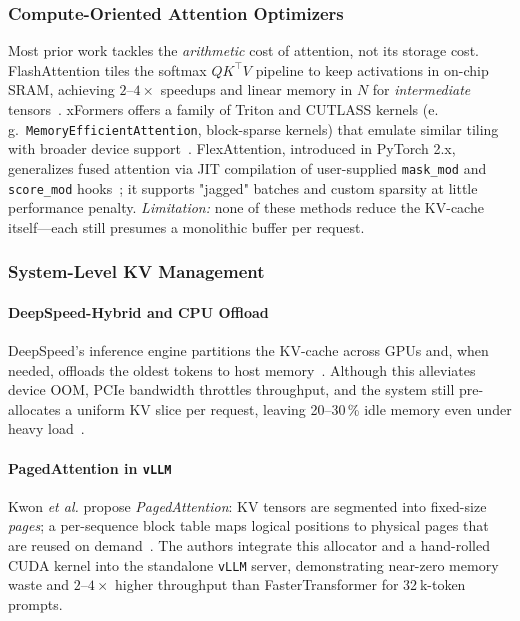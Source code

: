 \documentclass[conference]{IEEEtran}
\begin{document}
\subsubsection{Compute-Oriented Attention Optimizers}
Most prior work tackles the \emph{arithmetic} cost of attention, not its storage cost.  
FlashAttention tiles the softmax \(QK^{\top}V\) pipeline to keep activations in on-chip SRAM, achieving $2$–$4{\times}$ speedups and linear memory in $N$ for \emph{intermediate} tensors~\cite{dao2022flashattention}.  
xFormers offers a family of Triton and CUTLASS kernels (e.\,g.\ \texttt{MemoryEfficientAttention}, block-sparse kernels) that emulate similar tiling with broader device support~\cite{meta2022xformers}.  
FlexAttention, introduced in PyTorch 2.x, generalizes fused attention via JIT compilation of user-supplied \texttt{mask\_mod} and \texttt{score\_mod} hooks~\cite{pytorch2023flexattention}; it supports "jagged" batches and custom sparsity at little performance penalty.  
\emph{Limitation:} none of these methods reduce the KV-cache itself—each still presumes a monolithic buffer per request.

\subsubsection{System-Level KV Management}
\paragraph*{DeepSpeed-Hybrid and CPU Offload}
DeepSpeed's inference engine partitions the KV-cache across GPUs and, when needed, offloads the oldest tokens to host memory~\cite{rajbhandari2022deepspeed}.  
Although this alleviates device OOM, PCIe bandwidth throttles throughput, and the system still pre-allocates a uniform KV slice per request, leaving 20–30\,\% idle memory even under heavy load~\cite{deepspeed2023blog}.

\paragraph*{PagedAttention in \texttt{vLLM}}
Kwon \textit{et al.} propose \emph{PagedAttention}: KV tensors are segmented into fixed-size \textit{pages}; a per-sequence block table maps logical positions to physical pages that are reused on demand~\cite{kwon2023pagedattention}.  
The authors integrate this allocator and a hand-rolled CUDA kernel into the standalone \texttt{vLLM} server, demonstrating near-zero memory waste and $2$–$4{\times}$ higher throughput than FasterTransformer for 32 k-token prompts.  
\end{document}

